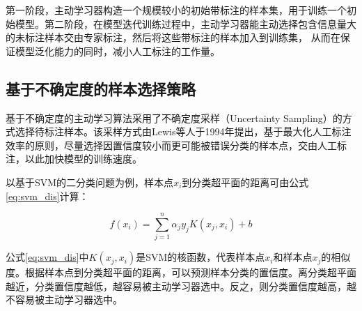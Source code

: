 
第一阶段，主动学习器构造一个规模较小的初始带标注的样本集，用于训练一个初始模型。第二阶段，在模型迭代训练过程中，主动学习器能主动选择包含信息量大的未标注样本交由专家标注，然后将这些带标注的样本加入到训练集， 从而在保证模型泛化能力的同时，减小人工标注的工作量。

\subsection{基于不确定度的样本选择策略}\label{sec:al_single}
基于不确定度的主动学习算法采用了不确定度采样（Uncertainty Sampling）的方式选择待标注样本。该采样方式由Lewis等人\cite{lewis1994heterogeneous}于1994年提出，基于最大化人工标注效率的原则，尽量选择因置信度较小而更可能被错误分类的样本点，交由人工标注，以此加快模型的训练速度。

以基于SVM的二分类问题为例，样本点$x_i$到分类超平面的距离可由公式\ref{eq:svm_dis}计算：

\begin{equation}\label{eq:svm_dis}
f(x_i)=\sum_{j=1}^{n}\alpha_j y_j K(x_j,x_i)+b
\end{equation}

公式\ref{eq:svm_dis}中$K(x_j,x_i)$是SVM的核函数，代表样本点$x_i$和样本点$x_j$的相似度。根据样本点到分类超平面的距离，可以预测样本分类的置信度。离分类超平面越近，分类置信度越低，越容易被主动学习器选中。反之，则分类置信度越高，越不容易被主动学习器选中。


